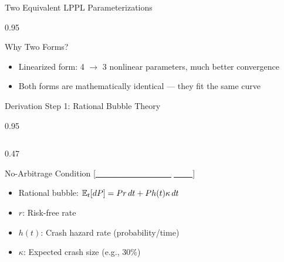 \documentclass[9pt, aspectratio=169, t]{beamer}
\begin{document}
\begin{frame}{Two Equivalent LPPL Parameterizations}
\begin{cminipage}{0.95\textwidth}
{    \vspace{-1mm}
    \begin{exampleblock}{Why Two Forms?}
        \begin{itemize}\setlength{\itemsep}{0pt}
            \item Linearized form: 4 $\to$ 3 nonlinear parameters, much better convergence
            \item Both forms are mathematically identical --- they fit the same curve
        \end{itemize}
    \end{exampleblock}
    }
    \end{cminipage}
\end{frame}

\begin{frame}{Derivation Step 1: Rational Bubble Theory}
    \begin{cminipage}{0.95\textwidth}
    {\footnotesize
    \begin{columns}[T]
        \begin{column}{0.47\textwidth}
            \begin{block}{No-Arbitrage Condition {\scriptsize[\href{https://doi.org/10.3386/w0945}{\textcolor{white}{Blanchard \& Watson, 1982}}]}}
                \begin{itemize}\setlength{\itemsep}{0pt}
                    \item Rational bubble: $\mathbb{E}_t[dP] = P r\, dt + P h(t) \kappa\, dt$
                    \item $r$: Risk-free rate
                    \item $h(t)$: Crash hazard rate (probability/time)
                    \item $\kappa$: Expected crash size (e.g., 30\%)
                \end{itemize}
            \end{block}


\end{column}
\end{columns}}
\end{cminipage}
\end{frame}
\end{document}
